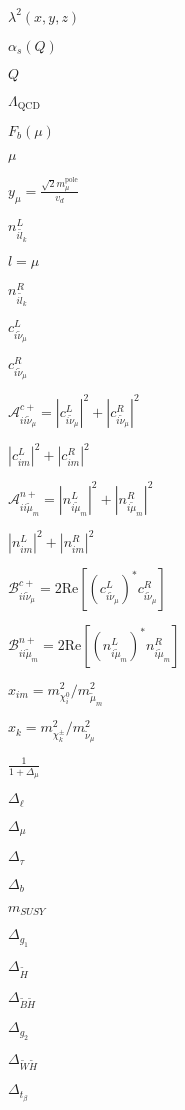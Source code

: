 \documentclass{article}
\begin{document}
$\lambda^2(x, y, z)$
\pagebreak

$\alpha_s(Q)$
\pagebreak

$Q$
\pagebreak

$\Lambda_{\text{QCD}}$
\pagebreak

$F_b(\mu)$
\pagebreak

$\mu$
\pagebreak

$y_\mu =
\frac{\sqrt{2} m_\mu^\text{pole}}{v_d}$
\pagebreak

$n^L_{i\tilde{l}_k}$
\pagebreak

$l=\mu$
\pagebreak

$n^R_{i\tilde{l}_k}$
\pagebreak

$c^L_{i\tilde{\nu}_\mu}$
\pagebreak

$c^R_{i\tilde{\nu}_\mu}$
\pagebreak

$\mathcal{A}^{c+}_{ii\tilde{\nu}_\mu} =
|c^L_{i\tilde{\nu}_\mu}|^2 + |c^R_{i\tilde{\nu}_\mu}|^2$
\pagebreak

$|c^L_{im}|^2 + |c^R_{im}|^2$
\pagebreak

$\mathcal{A}^{n+}_{ii\tilde{\mu}_m} =
|n^L_{i\tilde{\mu}_m}|^2 + |n^R_{i\tilde{\mu}_m}|^2$
\pagebreak

$|n^L_{im}|^2 + |n^R_{im}|^2$
\pagebreak

$\mathcal{B}^{c+}_{ii\tilde{\nu}_\mu} = 2 \text{Re}
[(c^L_{i\tilde{\nu}_\mu})^* c^R_{i\tilde{\nu}_\mu}]$
\pagebreak

$\mathcal{B}^{n+}_{ii\tilde{\mu}_m} = 2 \text{Re}
[(n^L_{i\tilde{\mu}_m})^* n^R_{i\tilde{\mu}_m}]$
\pagebreak

$x_{im} = m^2_{\chi_i^0} / m^2_{\tilde{\mu}_m}$
\pagebreak

$x_k = m^2_{\chi_k^\pm} / m^2_{\tilde{\nu}_\mu}$
\pagebreak

$\frac{1}{1 + \Delta_{\mu}}$
\pagebreak

$\Delta_{\ell}$
\pagebreak

$\Delta_{\mu}$
\pagebreak

$\Delta_{\tau}$
\pagebreak

$\Delta_b$
\pagebreak

$m_{SUSY}$
\pagebreak

$\Delta_{g_1}$
\pagebreak

$\Delta_{\tilde{H}}$
\pagebreak

$\Delta_{\tilde{B}\tilde{H}}$
\pagebreak

$\Delta_{g_2}$
\pagebreak

$\Delta_{\tilde{W}\tilde{H}}$
\pagebreak

$\Delta_{t_\beta}$
\pagebreak
\end{document}
